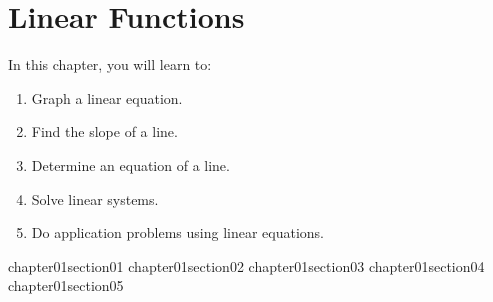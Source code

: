 \chapter{Linear Functions}\label{chapter_linear_functions}

In this chapter, you will learn to:

\begin{enumerate}
    \item Graph a linear equation.
    \item Find the slope of a line.
    \item Determine an equation of a line.
    \item Solve linear systems.
    \item Do application problems using linear equations.
\end{enumerate}


{chapter01section01}
{chapter01section02}
{chapter01section03}
{chapter01section04}
{chapter01section05}